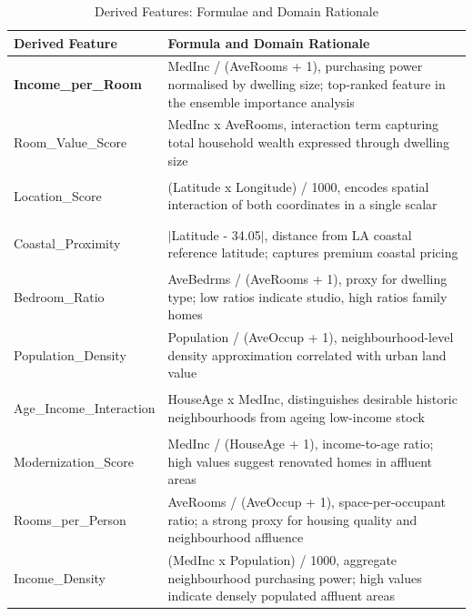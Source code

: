 \documentclass[pdflatex,sn-mathphys-num]{sn-jnl}
\begin{document}
\begin{table}[h]
\centering
\renewcommand{\arraystretch}{1.5}
\setlength{\tabcolsep}{10pt}

\caption{Derived Features: Formulae and Domain Rationale}
\begin{tabular}{|>{\bfseries}l|p{10cm}|}
\hline
\rowcolor[HTML]{2F4F7F}
\color{white} Derived Feature & \multicolumn{1}{l|}{\color{white} Formula and Domain Rationale} \\ \hline

\rowcolor[HTML]{E6E6E6}
Income\_per\_Room & MedInc / (AveRooms + 1), purchasing power normalised by dwelling size; top-ranked feature in the ensemble importance analysis \\ \hline

Room\_Value\_Score & MedInc x AveRooms, interaction term capturing total household wealth expressed through dwelling size \\ \hline

\rowcolor[HTML]{E6E6E6}
Location\_Score & (Latitude x Longitude) / 1000, encodes spatial interaction of both coordinates in a single scalar \\ \hline

Coastal\_Proximity & $|$Latitude - 34.05$|$, distance from LA coastal reference latitude; captures premium coastal pricing \\ \hline

\rowcolor[HTML]{E6E6E6}
Bedroom\_Ratio & AveBedrms / (AveRooms + 1), proxy for dwelling type; low ratios indicate studio, high ratios family homes \\ \hline

Population\_Density & Population / (AveOccup + 1), neighbourhood-level density approximation correlated with urban land value \\ \hline

\rowcolor[HTML]{E6E6E6}
Age\_Income\_Interaction & HouseAge x MedInc, distinguishes desirable historic neighbourhoods from ageing low-income stock \\ \hline

Modernization\_Score & MedInc / (HouseAge + 1), income-to-age ratio; high values suggest renovated homes in affluent areas \\ \hline

\rowcolor[HTML]{E6E6E6}
Rooms\_per\_Person & AveRooms / (AveOccup + 1), space-per-occupant ratio; a strong proxy for housing quality and neighbourhood affluence \\ \hline

Income\_Density & (MedInc x Population) / 1000, aggregate neighbourhood purchasing power; high values indicate densely populated affluent areas \\ \hline

\end{tabular}
\end{table}
\end{document}
